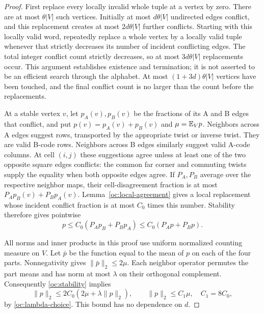 \begin{proof}
First replace every locally invalid whole tuple at a vertex by zero.
There are at most $\theta|V|$ such vertices.  Initially at most
$d\theta|V|$ undirected edges conflict, and this replacement creates
at most $2d\theta|V|$ further conflicts.  Starting with this locally
valid word, repeatedly replace a whole vertex by a locally valid tuple
whenever that strictly decreases its number of incident conflicting
edges.  The total integer conflict count strictly decreases, so at
most $3d\theta|V|$ replacements occur.  This argument establishes
existence and termination; it is not asserted to be an efficient
search through the alphabet.  At most $(1+3d)\theta|V|$ vertices have
been touched, and the final conflict count is no larger than the
count before the replacements.

At a stable vertex $v$, let $p_A(v),p_B(v)$ be the fractions of its
A and B edges that conflict, and put
$p(v)=p_A(v)+p_B(v)$ and $\mu=\mathbb{E}_Vp$.  Neighbors across A edges
suggest rows, transported by the appropriate twist or inverse twist.
They are valid B-code rows.  Neighbors across B edges similarly
suggest valid A-code columns.  At cell $(i,j)$ these suggestions
agree unless at least one of the two opposite square edges conflicts:
the common far corner and commuting twists supply the equality when
both opposite edges agree.  If $P_A,P_B$ average over the respective
neighbor maps, their cell-disagreement fraction is at most
$P_Ap_B(v)+P_Bp_A(v)$.  Lemma~\ref{oc:local-agreement} gives a local
replacement whose incident conflict fraction is at most $C_0$ times
this number.  Stability therefore gives pointwise
\begin{equation}\label{oc:stability}
 p\le C_0(P_Ap_B+P_Bp_A)\le C_0(P_Ap+P_Bp).
\end{equation}

All norms and inner products in this proof use uniform normalized
counting measure on $V$.  Let $\bar p$ be the function equal to the
mean of $p$ on each of the four parts.  Nonnegativity gives
$\|\bar p\|_2\le2\mu$.  Each neighbor operator permutes the part
means and has norm at most $\lambda$ on their orthogonal complement.
Consequently \eqref{oc:stability} implies
\[
 \|p\|_2\le2C_0(2\mu+\lambda\|p\|_2),
 \qquad \|p\|_2\le C_1\mu,\quad C_1=8C_0,
\]
by \eqref{oc:lambda-choice}.  This bound has no dependence on $d$.


\end{proof}
